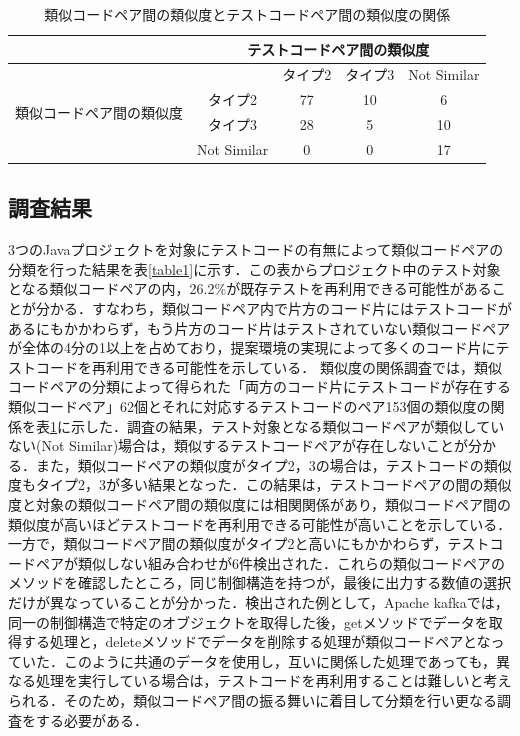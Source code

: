 \documentclass{fose2019}           %
\begin{document}
\begin{table}[]
\centering
\caption{類似コードペア間の類似度とテストコードペア間の類似度の関係}
\label{table2}
\begin{tabular}{|c|c|c|c|c|}
\hline
                             & \multicolumn{4}{c|}{\scriptsize テストコードペア間の類似度}         \\ \hline
\multirow{4}{*}{\scriptsize 類似コードペア間の類似度} &             & \scriptsize タイプ2 & \scriptsize タイプ3 & \scriptsize Not Similar \\ \cline{2-5} 
                             & \scriptsize タイプ2 & \scriptsize 77          & \scriptsize 10     & \scriptsize 6     \\ \cline{2-5} 
                             &\scriptsize タイプ3       & \scriptsize 28           & \scriptsize 5    & \scriptsize 10    \\ \cline{2-5} 
                             & \scriptsize Not Similar       & \scriptsize 0           & \scriptsize 0    & \scriptsize 17     \\ \hline
\end{tabular}
\end{table}


\subsection{調査結果}
3つのJavaプロジェクトを対象にテストコードの有無によって類似コードペアの分類を行った結果を表\ref{table1}に示す．この表からプロジェクト中のテスト対象となる類似コードペアの内，26.2\%が既存テストを再利用できる可能性があることが分かる．すなわち，類似コードペア内で片方のコード片にはテストコードがあるにもかかわらず，もう片方のコード片はテストされていない類似コードペアが全体の4分の1以上を占めており，提案環境の実現によって多くのコード片にテストコードを再利用できる可能性を示している．
\indent 類似度の関係調査では，類似コードペアの分類によって得られた「両方のコード片にテストコードが存在する類似コードペア」62個とそれに対応するテストコードのペア153個の類似度の関係を表\ref{table2}に示した．調査の結果，テスト対象となる類似コードペアが類似していない(Not Similar)場合は，類似するテストコードペアが存在しないことが分かる．また，類似コードペアの類似度がタイプ2，3の場合は，テストコードの類似度もタイプ2，3が多い結果となった．この結果は，テストコードペアの間の類似度と対象の類似コードペア間の類似度には相関関係があり，類似コードペア間の類似度が高いほどテストコードを再利用できる可能性が高いことを示している．
\indent 一方で，類似コードペア間の類似度がタイプ2と高いにもかかわらず，テストコードペアが類似しない組み合わせが6件検出された．これらの類似コードペアのメソッドを確認したところ，同じ制御構造を持つが，最後に出力する数値の選択だけが異なっていることが分かった．検出された例として，Apache kafkaでは，同一の制御構造で特定のオブジェクトを取得した後，getメソッドでデータを取得する処理と，deleteメソッドでデータを削除する処理が類似コードペアとなっていた．このように共通のデータを使用し，互いに関係した処理であっても，異なる処理を実行している場合は，テストコードを再利用することは難しいと考えられる．そのため，類似コードペア間の振る舞いに着目して分類を行い更なる調査をする必要がある．
\end{document}
